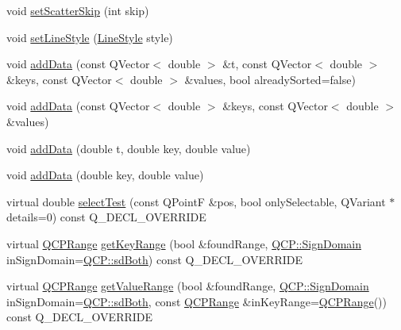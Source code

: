 \begin{DoxyCompactItemize}
\item 
void \mbox{\hyperlink{class_q_c_p_curve_a97dbfecd497e972d5f2162615e6da5be}{set\+Scatter\+Skip}} (int skip)
\item 
void \mbox{\hyperlink{class_q_c_p_curve_a4a377ec863ff81a1875c3094a6177c19}{set\+Line\+Style}} (\mbox{\hyperlink{class_q_c_p_curve_a2710e9f79302152cff794c6e16cc01f1}{Line\+Style}} style)
\item 
void \mbox{\hyperlink{class_q_c_p_curve_a73edf394b94f3f24f07518e30565a07f}{add\+Data}} (const Q\+Vector$<$ double $>$ \&t, const Q\+Vector$<$ double $>$ \&keys, const Q\+Vector$<$ double $>$ \&values, bool already\+Sorted=false)
\item 
void \mbox{\hyperlink{class_q_c_p_curve_a6424fa06da1786648c83ad13a0d0aa14}{add\+Data}} (const Q\+Vector$<$ double $>$ \&keys, const Q\+Vector$<$ double $>$ \&values)
\item 
void \mbox{\hyperlink{class_q_c_p_curve_a13398b236f6926014e404eeb5b9f415c}{add\+Data}} (double t, double key, double value)
\item 
void \mbox{\hyperlink{class_q_c_p_curve_ada4762e793cd5707b33f35b8a4b0f8fb}{add\+Data}} (double key, double value)
\item 
virtual double \mbox{\hyperlink{class_q_c_p_curve_a0ed9b7e6b4bc72010d6fcd974af46a8b}{select\+Test}} (const Q\+PointF \&pos, bool only\+Selectable, Q\+Variant $\ast$details=0) const Q\+\_\+\+D\+E\+C\+L\+\_\+\+O\+V\+E\+R\+R\+I\+DE
\item 
virtual \mbox{\hyperlink{class_q_c_p_range}{Q\+C\+P\+Range}} \mbox{\hyperlink{class_q_c_p_curve_a22d09087f78f254731197cc0b8783299}{get\+Key\+Range}} (bool \&found\+Range, \mbox{\hyperlink{namespace_q_c_p_afd50e7cf431af385614987d8553ff8a9}{Q\+C\+P\+::\+Sign\+Domain}} in\+Sign\+Domain=\mbox{\hyperlink{namespace_q_c_p_afd50e7cf431af385614987d8553ff8a9aa38352ef02d51ddfa4399d9551566e24}{Q\+C\+P\+::sd\+Both}}) const Q\+\_\+\+D\+E\+C\+L\+\_\+\+O\+V\+E\+R\+R\+I\+DE
\item 
virtual \mbox{\hyperlink{class_q_c_p_range}{Q\+C\+P\+Range}} \mbox{\hyperlink{class_q_c_p_curve_a8bb8e3b9085f15921dc40483fb025ab2}{get\+Value\+Range}} (bool \&found\+Range, \mbox{\hyperlink{namespace_q_c_p_afd50e7cf431af385614987d8553ff8a9}{Q\+C\+P\+::\+Sign\+Domain}} in\+Sign\+Domain=\mbox{\hyperlink{namespace_q_c_p_afd50e7cf431af385614987d8553ff8a9aa38352ef02d51ddfa4399d9551566e24}{Q\+C\+P\+::sd\+Both}}, const \mbox{\hyperlink{class_q_c_p_range}{Q\+C\+P\+Range}} \&in\+Key\+Range=\mbox{\hyperlink{class_q_c_p_range}{Q\+C\+P\+Range}}()) const Q\+\_\+\+D\+E\+C\+L\+\_\+\+O\+V\+E\+R\+R\+I\+DE
\end{DoxyCompactItemize}

